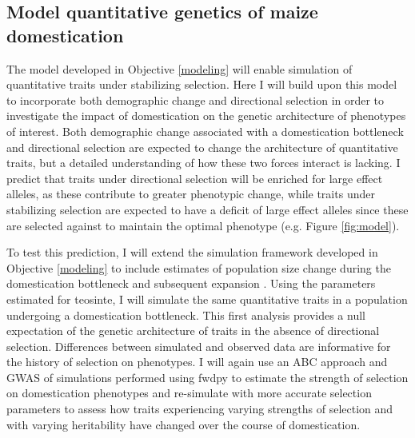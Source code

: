 \vspace{-1ex}	
\subsection{Model quantitative genetics of maize domestication}\vspace{-1ex}
\label{domestication}
The model developed in Objective \ref{modeling} will enable simulation of quantitative traits under stabilizing selection. Here I will build upon this model to incorporate both demographic change and directional selection in order to investigate the impact of domestication on the genetic architecture of phenotypes of interest. Both demographic change associated with a domestication bottleneck and directional selection are expected to change the architecture of quantitative traits, but a detailed understanding of how these two forces interact is lacking. I predict that traits under directional selection will be enriched for large effect alleles, as these contribute to greater phenotypic change, while traits under stabilizing selection are expected to have a deficit of large effect alleles since these are selected against to maintain the optimal phenotype (e.g. Figure \ref{fig:model}).

To test this prediction, I will extend the simulation framework developed in Objective \ref{modeling} to include estimates of population size change during the domestication bottleneck and subsequent expansion \citep{Wright:2005}. Using the parameters estimated for teosinte, I will simulate the same quantitative traits in a population undergoing a domestication bottleneck. This first analysis provides a null expectation of the genetic architecture of traits in the absence of directional selection. Differences between simulated and observed data \citep[][and our own on-going analyses---see Data Management Plan]{Wallace:2014} are informative for the history of selection on phenotypes. I will again use an ABC approach and GWAS of simulations performed using fwdpy to estimate the strength of selection on domestication phenotypes and re-simulate with more accurate selection parameters to assess how traits experiencing varying strengths of selection and with varying heritability have changed over the course of domestication.

